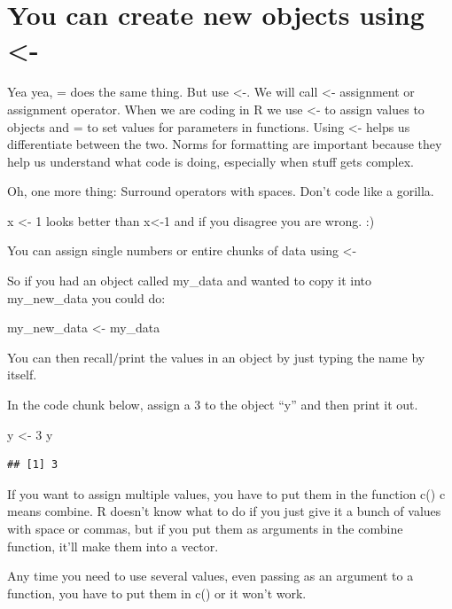 \documentclass[
]{book}
\newenvironment{Shaded}{\begin{snugshade}}{\end{snugshade}}
\newcommand{\DecValTok}[1]{\textcolor[rgb]{0.00,0.00,0.81}{#1}}
\newcommand{\NormalTok}[1]{#1}
\newcommand{\OtherTok}[1]{\textcolor[rgb]{0.56,0.35,0.01}{#1}}
\begin{document}
\hypertarget{you-can-create-new-objects-using--}{%
\section{You can create new objects using \textless-}\label{you-can-create-new-objects-using--}}

Yea yea, = does the same thing. But use \textless-. We will call \textless- assignment or assignment operator. When we are coding in R we use \textless- to assign values to objects and = to set values for parameters in functions. Using \textless- helps us differentiate between the two. Norms for formatting are important because they help us understand what code is doing, especially when stuff gets complex.

Oh, one more thing: Surround operators with spaces. Don't code like a gorilla.

x \textless- 1 looks better than x\textless-1 and if you disagree you are wrong. :)

You can assign single numbers or entire chunks of data using \textless-

So if you had an object called my\_data and wanted to copy it into my\_new\_data you could do:

my\_new\_data \textless- my\_data

You can then recall/print the values in an object by just typing the name by itself.

In the code chunk below, assign a 3 to the object ``y'' and then print it out.

\begin{Shaded}
\begin{Highlighting}[]
\NormalTok{y }\OtherTok{\textless{}{-}} \DecValTok{3}
\NormalTok{y}
\end{Highlighting}
\end{Shaded}

\begin{verbatim}
## [1] 3
\end{verbatim}

If you want to assign multiple values, you have to put them in the function c() c means combine. R doesn't know what to do if you just give it a bunch of values with space or commas, but if you put them as arguments in the combine function, it'll make them into a vector.

Any time you need to use several values, even passing as an argument to a function, you have to put them in c() or it won't work.
\end{document}
